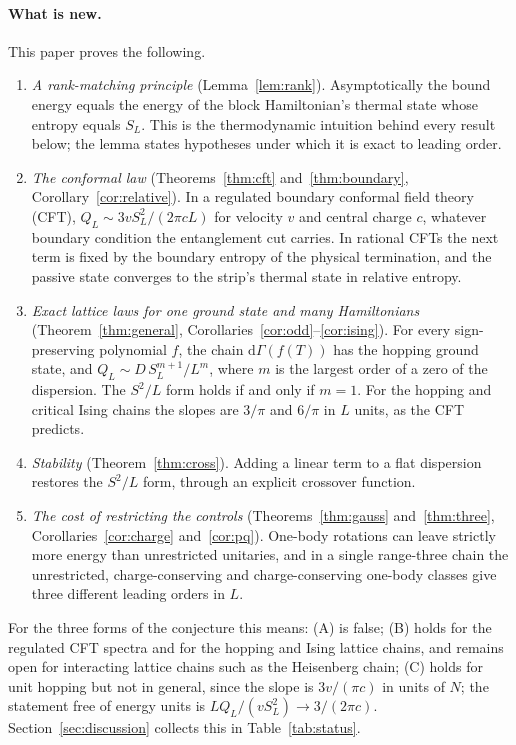 \documentclass[11pt,a4paper]{article}
\theoremstyle{remark}
\newcommand{\dd}{\mathrm d}
\begin{document}
\paragraph{What is new.} This paper proves the following.
\begin{enumerate}[leftmargin=2.2em,itemsep=2pt]
\item \emph{A rank-matching principle} (Lemma~\ref{lem:rank}). Asymptotically the bound energy equals the energy of the block Hamiltonian's thermal state whose entropy equals $S_L$. This is the thermodynamic intuition behind every result below; the lemma states hypotheses under which it is exact to leading order.
\item \emph{The conformal law} (Theorems~\ref{thm:cft} and~\ref{thm:boundary}, Corollary~\ref{cor:relative}). In a regulated boundary conformal field theory (CFT), $Q_L\sim3vS_L^2/(2\pi cL)$ for velocity $v$ and central charge $c$, whatever boundary condition the entanglement cut carries. In rational CFTs the next term is fixed by the boundary entropy of the physical termination, and the passive state converges to the strip's thermal state in relative entropy.
\item \emph{Exact lattice laws for one ground state and many Hamiltonians} (Theorem~\ref{thm:general}, Corollaries~\ref{cor:odd}--\ref{cor:ising}). For every sign-preserving polynomial $f$, the chain $\dd\Gamma(f(T))$ has the hopping ground state, and $Q_L\sim D\,S_L^{m+1}/L^m$, where $m$ is the largest order of a zero of the dispersion. The $S^2/L$ form holds if and only if $m=1$. For the hopping and critical Ising chains the slopes are $3/\pi$ and $6/\pi$ in $L$ units, as the CFT predicts.
\item \emph{Stability} (Theorem~\ref{thm:cross}). Adding a linear term to a flat dispersion restores the $S^2/L$ form, through an explicit crossover function.
\item \emph{The cost of restricting the controls} (Theorems~\ref{thm:gauss} and~\ref{thm:three}, Corollaries~\ref{cor:charge} and~\ref{cor:pq}). One-body rotations can leave strictly more energy than unrestricted unitaries, and in a single range-three chain the unrestricted, charge-conserving and charge-conserving one-body classes give three different leading orders in $L$.
\end{enumerate}
For the three forms of the conjecture this means: (A) is false; (B) holds for the regulated CFT spectra and for the hopping and Ising lattice chains, and remains open for interacting lattice chains such as the Heisenberg chain; (C) holds for unit hopping but not in general, since the slope is $3v/(\pi c)$ in units of $N$; the statement free of energy units is $LQ_L/(vS_L^2)\to3/(2\pi c)$. Section~\ref{sec:discussion} collects this in Table~\ref{tab:status}.
\end{document}

